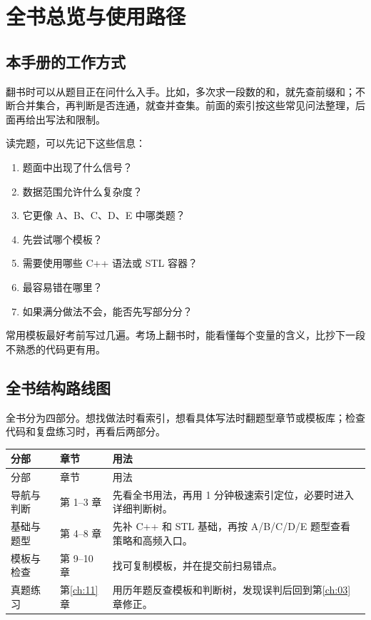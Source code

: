 \chapter{全书总览与使用路径}\label{ch:01}

\section{本手册的工作方式}\label{sec:01-1}

翻书时可以从题目正在问什么入手。比如，多次求一段数的和，就先查前缀和；不断合并集合，再判断是否连通，就查并查集。前面的索引按这些常见问法整理，后面再给出写法和限制。

读完题，可以先记下这些信息：

\begin{enumerate}
  \item 题面中出现了什么信号？
  \item 数据范围允许什么复杂度？
  \item 它更像 A、B、C、D、E 中哪类题？
  \item 先尝试哪个模板？
  \item 需要使用哪些 C++ 语法或 STL 容器？
  \item 最容易错在哪里？
  \item 如果满分做法不会，能否先写部分分？
\end{enumerate}

常用模板最好考前写过几遍。考场上翻书时，能看懂每个变量的含义，比抄下一段不熟悉的代码更有用。

\section{全书结构路线图}\label{sec:01-2}

全书分为四部分。想找做法时看索引，想看具体写法时翻题型章节或模板库；检查代码和复盘练习时，再看后两部分。

\begin{longtable}{p{3.2cm}p{4.2cm}p{6.6cm}}
\toprule
分部 & 章节 & 用法 \\
\midrule
\endfirsthead
\toprule
分部 & 章节 & 用法 \\
\midrule
\endhead
导航与判断 & 第 1--3 章 & 先看全书用法，再用 1 分钟极速索引定位，必要时进入详细判断树。 \\
基础与题型 & 第 4--8 章 & 先补 C++ 和 STL 基础，再按 A/B/C/D/E 题型查看策略和高频入口。 \\
模板与检查 & 第 9--10 章 & 找可复制模板，并在提交前扫易错点。 \\
真题练习 & 第\ref{ch:11}章 & 用历年题反查模板和判断树，发现误判后回到第\ref{ch:03}章修正。 \\
\bottomrule
\end{longtable}

